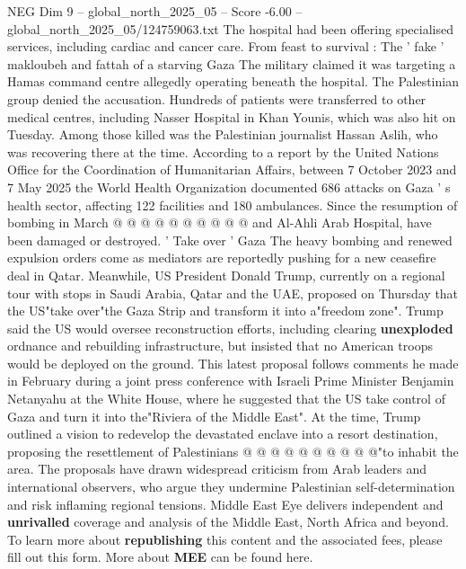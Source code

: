 \begin{textsample}{NEG Dim 9 – global\_north\_2025\_05 – Score -6.00 – global\_north\_2025\_05/124759063.txt}
The hospital had been offering specialised services, including cardiac and cancer care.
From feast to survival : The ' fake ' makloubeh and fattah of a starving Gaza The military claimed it was targeting a Hamas command centre allegedly operating beneath the hospital.
The Palestinian group denied the accusation.
Hundreds of patients were transferred to other medical centres, including Nasser Hospital in Khan Younis, which was also hit on Tuesday.
Among those killed was the Palestinian journalist Hassan Aslih, who was recovering there at the time.
According to a report by the United Nations Office for the Coordination of Humanitarian Affairs, between 7 October 2023 and 7 May 2025 the World Health Organization documented 686 attacks on Gaza ' s health sector, affecting 122 facilities and 180 ambulances.
Since the resumption of bombing in March @ @ @ @ @ @ @ @ @ @ and Al-Ahli Arab Hospital, have been damaged or destroyed. ' Take over ' Gaza The heavy bombing and renewed expulsion orders come as mediators are reportedly pushing for a new ceasefire deal in Qatar.
Meanwhile, US President Donald Trump, currently on a regional tour with stops in Saudi Arabia, Qatar and the UAE, proposed on Thursday that the US"take over"the Gaza Strip and transform it into a"freedom zone".
Trump said the US would oversee reconstruction efforts, including clearing \textbf{unexploded} ordnance and rebuilding infrastructure, but insisted that no American troops would be deployed on the ground.
This latest proposal follows comments he made in February during a joint press conference with Israeli Prime Minister Benjamin Netanyahu at the White House, where he suggested that the US take control of Gaza and turn it into the"Riviera of the Middle East".
At the time, Trump outlined a vision to redevelop the devastated enclave into a resort destination, proposing the resettlement of Palestinians @ @ @ @ @ @ @ @ @ @"to inhabit the area.
The proposals have drawn widespread criticism from Arab leaders and international observers, who argue they undermine Palestinian self-determination and risk inflaming regional tensions.
Middle East Eye delivers independent and \textbf{unrivalled} coverage and analysis of the Middle East, North Africa and beyond.
To learn more about \textbf{republishing} this content and the associated fees, please fill out this form.
More about \textbf{MEE} can be found here.

\end{textsample}
